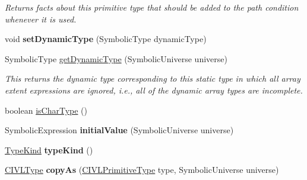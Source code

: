 \begin{DoxyCompactItemize}
\begin{DoxyCompactList}\small\item\em Returns facts about this primitive type that should be added to the path condition whenever it is used. \end{DoxyCompactList}\item 
\hypertarget{classedu_1_1udel_1_1cis_1_1vsl_1_1civl_1_1model_1_1common_1_1type_1_1CommonPrimitiveType_a93dffba4ea18f32ce74d3e91c36ff8cc}{}void {\bfseries set\+Dynamic\+Type} (Symbolic\+Type dynamic\+Type)\label{classedu_1_1udel_1_1cis_1_1vsl_1_1civl_1_1model_1_1common_1_1type_1_1CommonPrimitiveType_a93dffba4ea18f32ce74d3e91c36ff8cc}

\item 
Symbolic\+Type \hyperlink{classedu_1_1udel_1_1cis_1_1vsl_1_1civl_1_1model_1_1common_1_1type_1_1CommonPrimitiveType_add099ab8b4376cec1713a55e7392ddfb}{get\+Dynamic\+Type} (Symbolic\+Universe universe)
\begin{DoxyCompactList}\small\item\em This returns the dynamic type corresponding to this static type in which all array extent expressions are ignored, i.\+e., all of the dynamic array types are incomplete. \end{DoxyCompactList}\item 
boolean \hyperlink{classedu_1_1udel_1_1cis_1_1vsl_1_1civl_1_1model_1_1common_1_1type_1_1CommonPrimitiveType_a4383f9e1bff0e49a4e46486251cfec11}{is\+Char\+Type} ()
\item 
\hypertarget{classedu_1_1udel_1_1cis_1_1vsl_1_1civl_1_1model_1_1common_1_1type_1_1CommonPrimitiveType_abeb84a3ea25e8734ce8b93910b16037a}{}Symbolic\+Expression {\bfseries initial\+Value} (Symbolic\+Universe universe)\label{classedu_1_1udel_1_1cis_1_1vsl_1_1civl_1_1model_1_1common_1_1type_1_1CommonPrimitiveType_abeb84a3ea25e8734ce8b93910b16037a}

\item 
\hypertarget{classedu_1_1udel_1_1cis_1_1vsl_1_1civl_1_1model_1_1common_1_1type_1_1CommonPrimitiveType_af60ce1309b6cd3753f0abfef023c2bb4}{}\hyperlink{enumedu_1_1udel_1_1cis_1_1vsl_1_1civl_1_1model_1_1IF_1_1type_1_1CIVLType_1_1TypeKind}{Type\+Kind} {\bfseries type\+Kind} ()\label{classedu_1_1udel_1_1cis_1_1vsl_1_1civl_1_1model_1_1common_1_1type_1_1CommonPrimitiveType_af60ce1309b6cd3753f0abfef023c2bb4}

\item 
\hypertarget{classedu_1_1udel_1_1cis_1_1vsl_1_1civl_1_1model_1_1common_1_1type_1_1CommonPrimitiveType_a5573de69ca925da9906245011d542769}{}\hyperlink{interfaceedu_1_1udel_1_1cis_1_1vsl_1_1civl_1_1model_1_1IF_1_1type_1_1CIVLType}{C\+I\+V\+L\+Type} {\bfseries copy\+As} (\hyperlink{interfaceedu_1_1udel_1_1cis_1_1vsl_1_1civl_1_1model_1_1IF_1_1type_1_1CIVLPrimitiveType}{C\+I\+V\+L\+Primitive\+Type} type, Symbolic\+Universe universe)\label{classedu_1_1udel_1_1cis_1_1vsl_1_1civl_1_1model_1_1common_1_1type_1_1CommonPrimitiveType_a5573de69ca925da9906245011d542769}


\end{DoxyCompactItemize}
